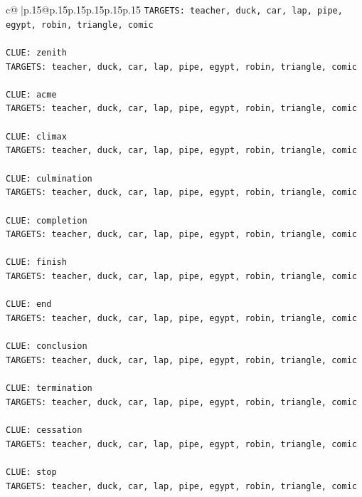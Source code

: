 \documentclass{article}
\begin{document}
{\begin{supertabular}{c@{$\;$}|p{.15\linewidth}@{}p{.15\linewidth}p{.15\linewidth}p{.15\linewidth}p{.15\linewidth}p{.15\linewidth}}
{{{\texttt{TARGETS: teacher, duck, car, lap, pipe, egypt, robin, triangle, comic} \\
\\ 
\texttt{CLUE: zenith} \\
\texttt{TARGETS: teacher, duck, car, lap, pipe, egypt, robin, triangle, comic} \\
\\ 
\texttt{CLUE: acme} \\
\texttt{TARGETS: teacher, duck, car, lap, pipe, egypt, robin, triangle, comic} \\
\\ 
\texttt{CLUE: climax} \\
\texttt{TARGETS: teacher, duck, car, lap, pipe, egypt, robin, triangle, comic} \\
\\ 
\texttt{CLUE: culmination} \\
\texttt{TARGETS: teacher, duck, car, lap, pipe, egypt, robin, triangle, comic} \\
\\ 
\texttt{CLUE: completion} \\
\texttt{TARGETS: teacher, duck, car, lap, pipe, egypt, robin, triangle, comic} \\
\\ 
\texttt{CLUE: finish} \\
\texttt{TARGETS: teacher, duck, car, lap, pipe, egypt, robin, triangle, comic} \\
\\ 
\texttt{CLUE: end} \\
\texttt{TARGETS: teacher, duck, car, lap, pipe, egypt, robin, triangle, comic} \\
\\ 
\texttt{CLUE: conclusion} \\
\texttt{TARGETS: teacher, duck, car, lap, pipe, egypt, robin, triangle, comic} \\
\\ 
\texttt{CLUE: termination} \\
\texttt{TARGETS: teacher, duck, car, lap, pipe, egypt, robin, triangle, comic} \\
\\ 
\texttt{CLUE: cessation} \\
\texttt{TARGETS: teacher, duck, car, lap, pipe, egypt, robin, triangle, comic} \\
\\ 
\texttt{CLUE: stop} \\
\texttt{TARGETS: teacher, duck, car, lap, pipe, egypt, robin, triangle, comic} \\
}}}
\end{supertabular}}
\end{document}
